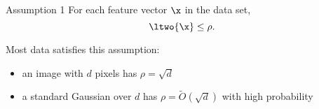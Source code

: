 \begin{frame}

\begin{block}{Assumption 1}
For each feature vector $\x$ in the data set,
\begin{equation}
\ltwo{\x} \le \rho.
\end{equation}
\end{block}

Most data satisfies this assumption:
\begin{itemize}
\item an image with $d$ pixels has $\rho=\sqrt{d}$
\item a standard Gaussian over $d$ has $\rho=\tilde O(\sqrt d)$ with high probability
\end{itemize}

\end{frame}
